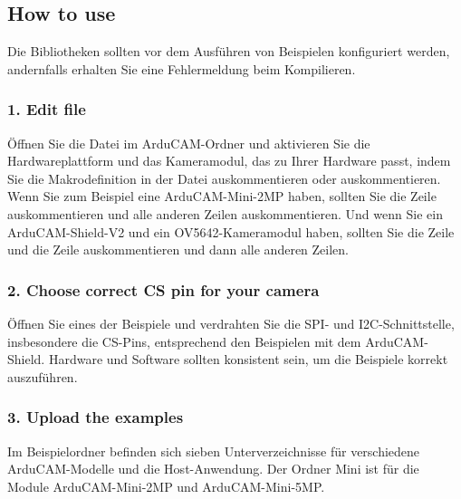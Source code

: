 \subsection{How to use}

Die Bibliotheken sollten vor dem Ausführen von Beispielen konfiguriert werden, andernfalls erhalten Sie eine Fehlermeldung beim Kompilieren.

\subsubsection{1. Edit  file}

Öffnen Sie die Datei  im ArduCAM-Ordner und aktivieren Sie die Hardwareplattform und das Kameramodul, das zu Ihrer Hardware passt, indem Sie die Makrodefinition in der Datei auskommentieren oder auskommentieren. Wenn Sie zum Beispiel eine ArduCAM-Mini-2MP haben, sollten Sie die Zeile  auskommentieren und alle anderen Zeilen auskommentieren. Und wenn Sie ein ArduCAM-Shield-V2 und ein OV5642-Kameramodul haben, sollten Sie die Zeile  und die Zeile  auskommentieren und dann alle anderen Zeilen.

\subsubsection{2. Choose correct CS pin for your camera}

Öffnen Sie eines der Beispiele und verdrahten Sie die SPI- und I2C-Schnittstelle, insbesondere die CS-Pins, entsprechend den Beispielen mit dem ArduCAM-Shield. Hardware und Software sollten konsistent sein, um die Beispiele korrekt auszuführen.

\subsubsection{3. Upload the examples}


Im Beispielordner befinden sich sieben Unterverzeichnisse für verschiedene ArduCAM-Modelle und die Host-Anwendung. Der Ordner Mini ist für die Module ArduCAM-Mini-2MP und ArduCAM-Mini-5MP.

